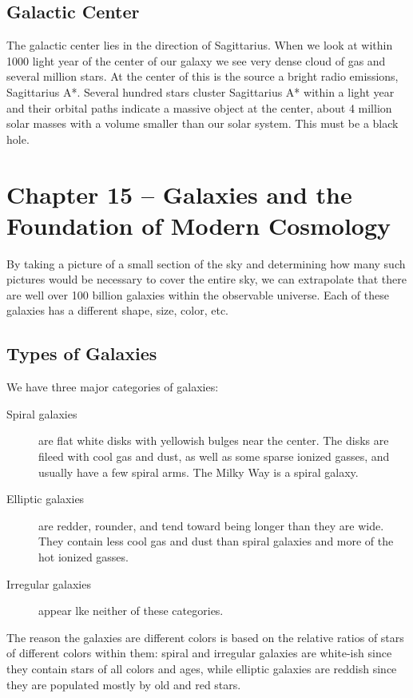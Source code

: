 \documentclass[12pt]{article}
\begin{document}
\subsection{Galactic Center}
The galactic center lies in the direction of Sagittarius. When we look at within 1000 light year of the center of our galaxy we see very dense cloud of gas and several million stars. At the center of this is the source a bright radio emissions, Sagittarius A*. Several hundred stars cluster Sagittarius A* within a light year and their orbital paths indicate a massive object at the center, about 4 million solar masses with a volume smaller than our solar system. This must be a black hole.

\section{Chapter 15 -- Galaxies and the Foundation of Modern Cosmology}
By taking a picture of a small section of the sky and determining how many such pictures would be necessary to cover the entire sky, we can extrapolate that there are well over 100 billion galaxies within the observable universe. Each of these galaxies has a different shape, size, color, etc.

\subsection{Types of Galaxies}
We have three major categories of galaxies:
\begin{description}
\item[Spiral galaxies] are flat white disks with yellowish bulges near the center. The disks are fileed with cool gas and dust, as well as some sparse ionized gasses, and usually have a few spiral arms. The Milky Way is a spiral galaxy.
\item[Elliptic galaxies] are redder, rounder, and tend toward being longer than they are wide. They contain less cool gas and dust than spiral galaxies and more of the hot ionized gasses.
\item[Irregular galaxies] appear lke neither of these categories.
\end{description}

The reason the galaxies are different colors is based on the relative ratios of stars of different colors within them: spiral and irregular galaxies are white-ish since they contain stars of all colors and ages, while elliptic galaxies are reddish since they are populated mostly by old and red stars.
\end{document}
